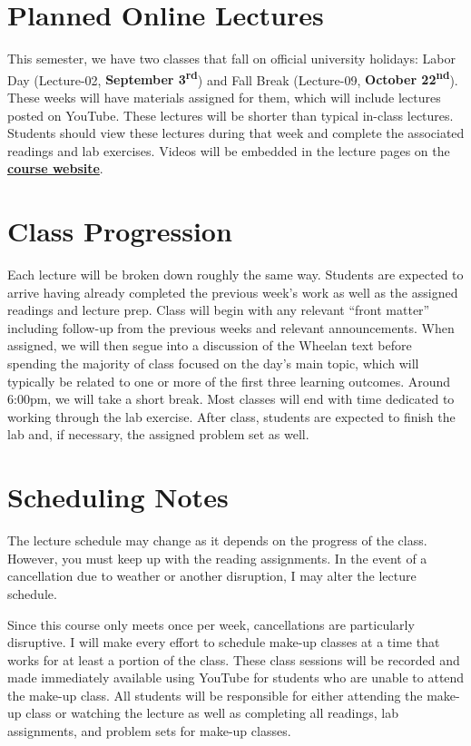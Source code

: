 \documentclass[]{book}
\theoremstyle{definition}
\theoremstyle{definition}
\theoremstyle{definition}
\theoremstyle{remark}
\begin{document}
\section{Planned Online Lectures}\label{planned-online-lectures}

This semester, we have two classes that fall on official university
holidays: Labor Day (Lecture-02, \textbf{September
3\textsuperscript{rd}}) and Fall Break (Lecture-09, \textbf{October
22\textsuperscript{nd}}). These weeks will have materials assigned for
them, which will include lectures posted on YouTube. These lectures will
be shorter than typical in-class lectures. Students should view these
lectures during that week and complete the associated readings and lab
exercises. Videos will be embedded in the lecture pages on the
\href{https://slu-soc5050.github.io/}{\textbf{course website}}.

\section{Class Progression}\label{class-progression}

Each lecture will be broken down roughly the same way. Students are
expected to arrive having already completed the previous week's work as
well as the assigned readings and lecture prep. Class will begin with
any relevant ``front matter'' including follow-up from the previous
weeks and relevant announcements. When assigned, we will then segue into
a discussion of the Wheelan text before spending the majority of class
focused on the day's main topic, which will typically be related to one
or more of the first three learning outcomes. Around 6:00pm, we will
take a short break. Most classes will end with time dedicated to working
through the lab exercise. After class, students are expected to finish
the lab and, if necessary, the assigned problem set as well.

\section{Scheduling Notes}\label{scheduling-notes}

The lecture schedule may change as it depends on the progress of the
class. However, you must keep up with the reading assignments. In the
event of a cancellation due to weather or another disruption, I may
alter the lecture schedule.

Since this course only meets once per week, cancellations are
particularly disruptive. I will make every effort to schedule make-up
classes at a time that works for at least a portion of the class. These
class sessions will be recorded and made immediately available using
YouTube for students who are unable to attend the make-up class. All
students will be responsible for either attending the make-up class or
watching the lecture as well as completing all readings, lab
assignments, and problem sets for make-up classes.
\end{document}
